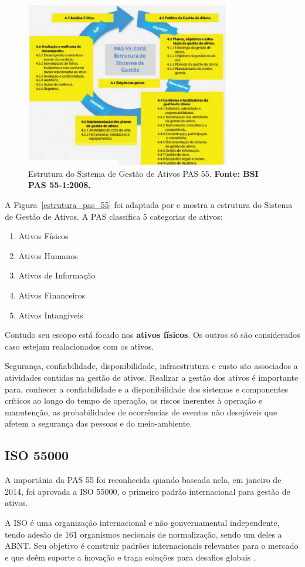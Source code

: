 \graphicspath{{figuras/}}
\begin{figure}[h]
\centering
\includegraphics[width=0.8\textwidth]{figura1.eps}
\caption{Estrutura do Sistema de Gestão de Ativos PAS 55. \textbf{Fonte: BSI PAS 55-1:2008.}}
\label{estrututa_pas_55}
\end{figure}

%

A Figura~\ref{estrutura_pas_55} foi adaptada por \cite{valeria2013} e mostra a estrutura do Sistema de Gestão de Ativos. A PAS classifica 5 categorias de ativos:

\begin{enumerate}
	\item{Ativos Físicos}
	\item{Ativos Humanos}
	\item{Ativos de Informação}
	\item{Ativos Financeiros}
	\item{Ativos Intangíveis}
\end{enumerate}

Contudo seu escopo está focado nos \textbf{ativos físicos}. Os outros só são considerados caso estejam realacionados com os ativos.

Segurança, confiabilidade, disponibilidade, infraestrutura e custo são associados a atividades contidas na gestão de ativos. 
Realizar a gestão dos ativos é importante para, conhecer a confiabilidade e a disponibilidade dos sistemas e componentes críticos ao longo do tempo de operação, os riscos inerentes à operação e manutenção, as probabilidades de ocorrências de eventos não desejáveis que afetem a segurança das pessoas e do meio-ambiente.


\subsection{ISO 55000}

A importânia da PAS 55 foi reconhecida quando baseada nela, em janeiro de 2014, foi aprovada a ISO 55000, o primeiro padrão internacional para gestão de ativos. 

A ISO é uma organização internacional e não gonvernamental independente, tendo adesão de 161 organismos necionais de normalização, sendo um deles a ABNT. Seu objetivo é construir padrões internacionais relevantes para o mercado e que deêm suporte a inovação e traga soluções para desafios globais .

